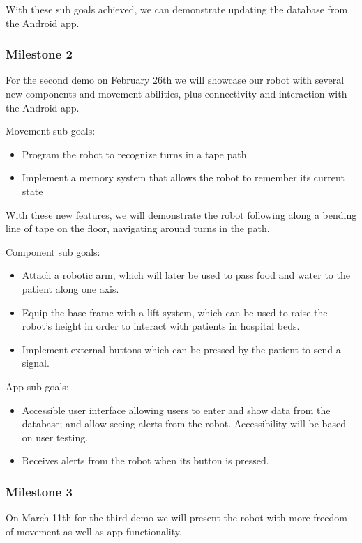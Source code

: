 \documentclass{article}
\begin{document}
With these sub goals achieved, we can demonstrate updating the database from the Android app.

\subsubsection{Milestone 2}

For the second demo on February 26th we will showcase our robot with several new components and movement abilities, plus connectivity and interaction with the Android app.  

Movement sub goals:
\begin{itemize}
\item Program the robot to recognize turns in a tape path
\item Implement a memory system that allows the robot to remember its current state 
\end{itemize}

With these new features, we will demonstrate the robot following along a bending line of tape on the floor, navigating around turns in the path. %

Component sub goals:
\begin{itemize}
\item Attach a robotic arm, which will later be used to pass food and water to the patient along one axis.
\item Equip the base frame with a lift system, which can be used to raise the robot's height in order to interact with patients in hospital beds.
\item Implement external buttons which can be pressed by the patient to send a signal.
\end{itemize}

App sub goals:
\begin{itemize}
\item Accessible user interface allowing users to enter and show data from the database; and allow seeing alerts from the robot. Accessibility will be based on user testing.  
\item Receives alerts from the robot when its button is pressed.
\end{itemize}

\subsubsection{Milestone 3}

On March 11th for the third demo we will present the robot with more freedom of movement as well as app functionality. 
\end{document}
